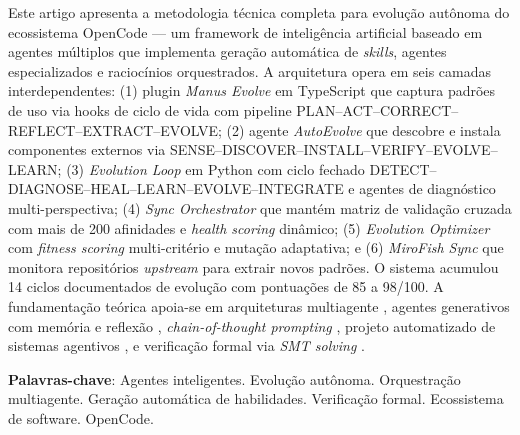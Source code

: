 \documentclass[
  article,
  12pt,
  oneside,
  a4paper,
  brazil,
  sumario=tradicional
]{abntex2}
\begin{document}
\frenchspacing
\maketitle

\begin{resumoumacoluna}
Este artigo apresenta a metodologia técnica completa para evolução autônoma do ecossistema OpenCode --- um framework de inteligência artificial baseado em agentes múltiplos que implementa geração automática de \emph{skills}, agentes especializados e raciocínios orquestrados. A arquitetura opera em seis camadas interdependentes: (1) plugin \emph{Manus Evolve} em TypeScript que captura padrões de uso via hooks de ciclo de vida com pipeline PLAN--ACT--CORRECT--REFLECT--EXTRACT--EVOLVE; (2) agente \emph{AutoEvolve} que descobre e instala componentes externos via SENSE--DISCOVER--INSTALL--VERIFY--EVOLVE--LEARN; (3) \emph{Evolution Loop} em Python com ciclo fechado DETECT--DIAGNOSE--HEAL--LEARN--EVOLVE--INTEGRATE e agentes de diagnóstico multi-perspectiva; (4) \emph{Sync Orchestrator} que mantém matriz de validação cruzada com mais de 200 afinidades e \emph{health scoring} dinâmico; (5) \emph{Evolution Optimizer} com \emph{fitness scoring} multi-critério e mutação adaptativa; e (6) \emph{MiroFish Sync} que monitora repositórios \emph{upstream} para extrair novos padrões. O sistema acumulou 14 ciclos documentados de evolução com pontuações de 85 a 98/100. A fundamentação teórica apoia-se em arquiteturas multiagente \cite{wu2023autogen}, agentes generativos com memória e reflexão \cite{park2023generative,shinn2023reflexion}, \emph{chain-of-thought prompting} \cite{wei2022chainofthought}, projeto automatizado de sistemas agentivos \cite{hu2024adas}, e verificação formal via \emph{SMT solving} \cite{demoura2008z3}.

\vspace{\onelineskip}
\noindent\textbf{Palavras-chave}: Agentes inteligentes. Evolução autônoma. Orquestração multiagente. Geração automática de habilidades. Verificação formal. Ecossistema de software. OpenCode.
\end{resumoumacoluna}
\end{document}
